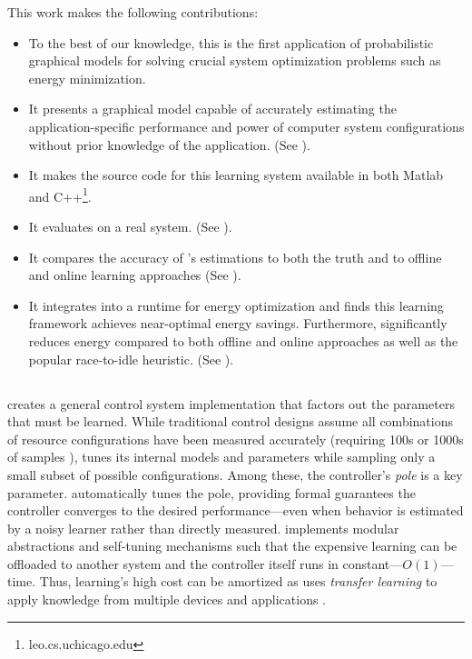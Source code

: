 This work makes the following contributions:
\begin{itemize}
\item To the best of our knowledge, this is the first application of
 probabilistic graphical models for solving crucial system
 optimization problems such as energy minimization.
\item It presents a graphical model capable of accurately
 estimating the application-specific performance and power of
 computer system configurations without prior knowledge of the
 application. (See ).
\item It makes the source code for this learning system available in
 both Matlab and C++\footnote{leo.cs.uchicago.edu}.
\item It evaluates \SYSTEMLEO{} on a real system. (See
 ).
\item It compares the accuracy of \SYSTEMLEO{}'s estimations to both the
 truth and to offline and online learning approaches (See
 ).
\item It integrates \SYSTEMLEO{} into a runtime for energy optimization
 and finds this learning framework achieves near-optimal energy
 savings.  Furthermore, \SYSTEMLEO{} significantly reduces energy
 compared to both offline and online approaches as well as the
 popular race-to-idle heuristic.  (See
 ).
\end{itemize}

\subsection{\SYSTEM{}}
\SYSTEM{} creates a general control system implementation that factors
out the parameters that must be learned.  While traditional control
designs assume all combinations of resource configurations have been
measured accurately (requiring 100s or 1000s of samples
\cite{sysid,FSE2015}), \SYSTEM{} tunes its internal models and
parameters while sampling only a small subset of possible
configurations.  Among these, the controller's \emph{pole} is a key
parameter.  \SYSTEM{} automatically tunes the pole, providing formal
guarantees the controller converges to the desired performance---even
when behavior is estimated by a noisy learner rather than directly
measured.  \SYSTEM{} implements modular abstractions and self-tuning
mechanisms such that the expensive learning can be offloaded to
another system and the controller itself runs in
constant---$O(1)$---time.  Thus, learning's high cost can be amortized
as \SYSTEM{} uses \emph{transfer learning} to apply knowledge from
multiple devices and applications \cite{pan2010survey}.

